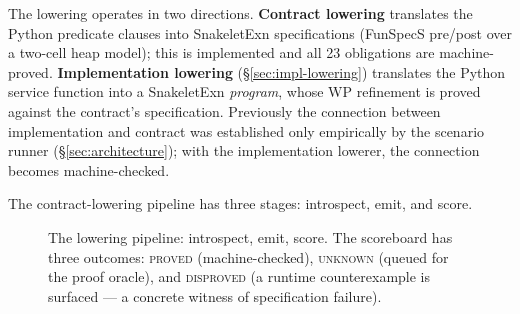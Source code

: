 \documentclass[11pt,a4paper]{article}
\begin{document}
The lowering operates in two directions.  \textbf{Contract lowering}
translates the Python predicate clauses into SnakeletExn
specifications (FunSpecS pre/post over a two-cell heap model); this is
implemented and all 23 obligations are machine-proved.
\textbf{Implementation lowering} (\S\ref{sec:impl-lowering}) translates
the Python service function into a SnakeletExn \emph{program}, whose
WP refinement is proved against the contract's specification.
Previously the connection between implementation and contract was
established only empirically by the scenario runner
(\S\ref{sec:architecture}); with the implementation lowerer, the
connection becomes machine-checked.

The contract-lowering pipeline has three stages:
\textsf{introspect}, \textsf{emit}, and \textsf{score}.

\begin{figure}[t]
\centering\small
{}
\caption{The lowering pipeline: introspect, emit, score.  The
scoreboard has three outcomes: \textsc{proved} (machine-checked),
\textsc{unknown} (queued for the proof oracle), and \textsc{disproved}
(a runtime counterexample is surfaced — a concrete witness of
specification failure).}
\label{fig:lowering}
\end{figure}
\end{document}
